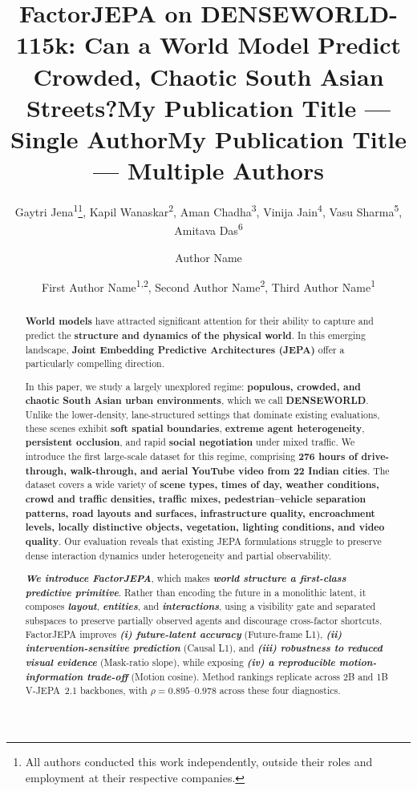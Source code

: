 \documentclass[letterpaper]{article} %
\title{FactorJEPA on DENSEWORLD-115k: Can a World Model Predict Crowded, Chaotic South Asian Streets?}
\author{
    Gaytri Jena\textsuperscript{\rm 1}\thanks{All authors conducted this work independently, outside their roles and employment at their respective companies.},
    Kapil Wanaskar\textsuperscript{\rm 2},
    Aman Chadha\textsuperscript{\rm 3},
    Vini{}ja Jain\textsuperscript{\rm 4},  %
    Vasu Sharma\textsuperscript{\rm 5},
    Amitava Das\textsuperscript{\rm 6}
}
\title{My Publication Title --- Single Author}
\author {
    Author Name
}
\title{My Publication Title --- Multiple Authors}
\author {
    First Author Name\textsuperscript{\rm 1,\rm 2}\equalcontrib,
    Second Author Name\textsuperscript{\rm 2}\equalcontrib,
    Third Author Name\textsuperscript{\rm 1}\corresponding
}
\begin{document}
\maketitle

\begin{abstract}


\textbf{World models} have attracted significant attention for their ability to capture and predict the \textbf{structure and dynamics of the physical world}. In this emerging landscape, \textbf{Joint Embedding Predictive Architectures (JEPA)} offer a particularly compelling direction. 

In this paper, we study a largely unexplored regime: \textbf{populous, crowded, and chaotic South Asian urban environments}, which we call \textbf{DENSEWORLD}. Unlike the lower-density, lane-structured settings that dominate existing evaluations, these scenes exhibit \textbf{soft spatial boundaries}, \textbf{extreme agent heterogeneity}, \textbf{persistent occlusion}, and rapid \textbf{social negotiation} under mixed traffic. We introduce the first large-scale dataset for this regime, comprising \textbf{276 hours of drive-through, walk-through, and aerial YouTube video from 22 Indian cities}. The dataset covers a wide variety of \textbf{scene types, times of day, weather conditions, crowd and traffic densities, traffic mixes, pedestrian--vehicle separation patterns, road layouts and surfaces, infrastructure quality, encroachment levels, locally distinctive objects, vegetation, lighting conditions, and video quality}. Our evaluation reveals that existing JEPA formulations struggle to preserve dense interaction dynamics under heterogeneity and partial observability.

\textbf{\emph{We introduce FactorJEPA}}, which makes \textbf{\emph{world structure a first-class predictive primitive}}. Rather than encoding the future in a monolithic latent, it composes \textbf{\emph{layout}}, \textbf{\emph{entities}}, and \textbf{\emph{interactions}}, using a visibility gate and separated subspaces to preserve partially observed agents and discourage cross-factor shortcuts. FactorJEPA improves \textbf{\emph{(i) future-latent accuracy}} (Future-frame L1), \textbf{\emph{(ii) intervention-sensitive prediction}} (Causal L1), and \textbf{\emph{(iii) robustness to reduced visual evidence}} (Mask-ratio slope), while exposing \textbf{\emph{(iv) a reproducible motion-information trade-off}} (Motion cosine). Method rankings replicate across 2B and 1B V-JEPA~2.1 backbones, with $\rho=0.895$--$0.978$ across these four diagnostics.


\end{abstract}
\end{document}
